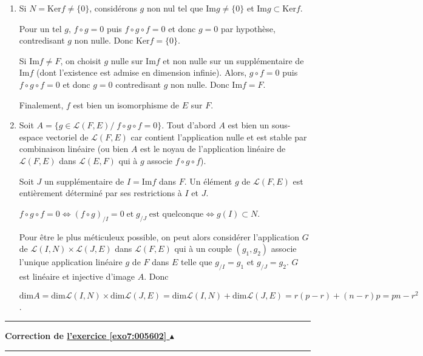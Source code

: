 \documentclass[11pt,a4paper]{article}
\newcounter{exo}
\newcommand{\correction}[1]{\hypertarget{cor7:#1}{}\label{cor7:#1}{\bf Correction de \hyperlink{exo7:#1}{l'exercice \ref{exo7:#1} $\blacktriangle$}}\vspace{1mm}\hrule\vspace{1mm}}
\newcommand{\fincorrection}{\vspace{1mm}\hrule\vspace*{7mm}}
\begin{document}
\begin{enumerate}
 \item  Si $N=\text{Ker}f\neq\{0\}$, considérons $g$ non nul tel que $\text{Im}g\neq\{0\}$ et $\text{Im}g\subset\text{Ker}f$.

Pour un tel $g$, $f\circ g = 0$ puis $f\circ g\circ f = 0$ et donc $g = 0$ par hypothèse, contredisant $g$ non nulle. Donc $\text{Ker}f =\{0\}$.

Si $\text{Im}f\neq F$, on choisit $g$ nulle sur $\text{Im}f$ et non nulle  sur un supplémentaire de $\text{Im}f$ (dont l'existence est admise en dimension infinie). Alors, $g\circ f = 0$ puis $f\circ g\circ f = 0$ et donc $g = 0$ contredisant $g$ non nulle. Donc $\text{Im}f = F$.

Finalement, $f$ est bien un isomorphisme de $E$ sur $F$.

\item  Soit $A=\{g\in\mathcal{L}(F,E)/\;f\circ g\circ f = 0\}$. Tout d'abord $A$ est bien un sous-espace vectoriel de $\mathcal{L}(F,E)$ car contient l'application nulle et est stable par combinaison linéaire (ou bien $A$ est le noyau de l'application linéaire de $\mathcal{L}(F,E)$ dans $\mathcal{L}(E,F)$ qui à $g$ associe $f\circ g\circ f$).

Soit $J$ un supplémentaire de $I=\text{Im}f$ dans $F$. Un élément $g$ de $\mathcal{L}(F,E)$ est entièrement déterminé par ses restrictions à $I$ et $J$.

\begin{center}
$f\circ g\circ f = 0\Leftrightarrow(f\circ g)_{/I}= 0\;\text{et}\;g_{/J}\;\text{est quelconque}\Leftrightarrow g(I)\subset N$.
\end{center}

Pour être le plus méticuleux possible, on peut alors considérer l'application $G$ de $\mathcal{L}(I,N)\times\mathcal{L}(J,E)$ dans $\mathcal{L}(F,E)$ qui à un couple $(g_1,g_2)$ associe l'unique application linéaire $g$ de $F$ dans $E$ telle que $g_{/I}= g_1$ et $g_{/J}=g_2$. $G$ est linéaire et injective d'image $A$. Donc 

\begin{center}
$\text{dim}A =\text{dim}\mathcal{L}(I,N)\times\text{dim}\mathcal{L}(J,E)=\text{dim}\mathcal{L}(I,N) + \text{dim}\mathcal{L}(J,E) = r(p - r) + (n - r)p = pn - r^2$.
\end{center}
\end{enumerate}
\fincorrection
\correction{005602}
\end{document}
